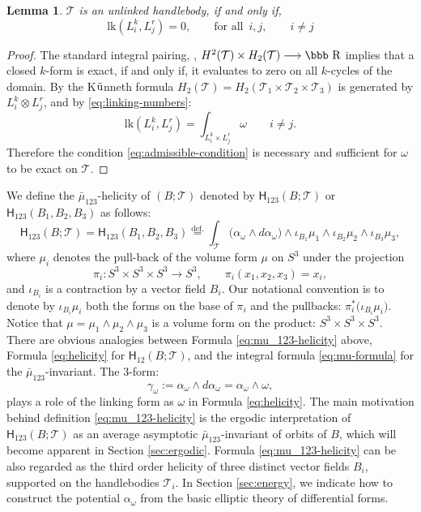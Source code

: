 \documentclass[12pt]{article}
\numberwithin{equation}{section}
\newtheorem{lemma}[theorem]{Lemma}
\newcommand{\R}{\mbox{\bbb R}}       %
\newcommand{\no}{\noindent}
\begin{document}
\begin{lemma}\label{lem:unlinked-handlebody}
  $\mathcal{T}$ is an unlinked handlebody, if and only if, 
  \begin{equation}\label{eq:admissible-condition}
  \text{lk}(L^k_i,L^r_j)  = 0,\qquad \text{for all\ }\, i,j,\qquad i\neq j
 \end{equation}
\end{lemma}
\begin{proof}
The standard integral pairing, \cite{Bott82}, $H^2(\mathcal{T})\times H_2(\mathcal{T})\longrightarrow \R$ implies that a closed $k$-form is exact, if and only if, it evaluates to zero on all $k$-cycles of the domain. By the K$\ddot{\rm u}$nneth formula $H_2(\mathcal{T})=H_2(\mathcal{T}_1\times \mathcal{T}_2\times \mathcal{T}_3)$ is generated by $L^k_i\otimes L^r_j$, and by \eqref{eq:linking-numbers}:
\[
 \text{lk}(L^k_i,L^r_j) = \int_{L^k_i\times L^r_j} \omega\qquad  i\neq j.
\]
Therefore the condition \eqref{eq:admissible-condition} is necessary and sufficient for $\omega$ to be exact on $\mathcal{T}$.
\end{proof}

\no We define the $\bar{\mu}_{123}$-helicity of $(B;\mathcal{T})$  denoted by $\mathsf{H}_{123}(B;\mathcal{T})$ or $\mathsf{H}_{123}(B_1,B_2,B_3)$
as follows:
\begin{equation}\label{eq:mu_123-helicity}
\boxed{\mathsf{H}_{123}(B;\mathcal{T})=\mathsf{H}_{123}(B_1,B_2,B_3)\stackrel{\text{def.}}{=}\int_{\mathcal{T}} \bigl(\alpha_\omega\wedge d\alpha_\omega\bigr)\wedge \iota_{B_1}\mu_1\wedge \iota_{B_2}\mu_2\wedge \iota_{B_3}\mu_3, }
\end{equation}
where $\mu_i$ denotes the pull-back of the volume form $\mu$ on $S^3$ under the projection 
\begin{equation}\label{eq:projection-i}
\pi_i:S^3\times S^3\times S^3\longrightarrow S^3,\qquad \pi_i(x_1,x_2,x_3)=x_i,
\end{equation}
and $\iota_{B_i}$ is a contraction by a vector field $B_i$. Our notational convention is to denote by $\iota_{B_i}\mu_i$ both the forms on the base of $\pi_i$ and the pullbacks: $\pi^\ast_i\bigl(\iota_{B_i}\mu_i\bigr)$. Notice that $\mu=\mu_1\wedge\mu_2\wedge\mu_3$ is a volume form on the product: $S^3\times S^3\times S^3$.   
 There are obvious analogies between Formula \eqref{eq:mu_123-helicity} above, Formula \eqref{eq:helicity} for $\mathsf{H}_{12}(B;\mathcal{T})$, and the integral formula \eqref{eq:mu-formula} for the 
$\bar{\mu}_{123}$-invariant. The $3$-form:
 \[
 \gamma_\omega:=\alpha_\omega\wedge d\alpha_\omega=\alpha_\omega\wedge \omega,
 \]
 plays a role of the linking form as $\omega$ in Formula \eqref{eq:helicity}. 
 The main motivation behind definition \eqref{eq:mu_123-helicity} is the ergodic interpretation  of $\mathsf{H}_{123}(B;\mathcal{T})$ as an average asymptotic $\bar{\mu}_{123}$-invariant of orbits of $B$, which will become apparent in Section \ref{sec:ergodic}. Formula \eqref{eq:mu_123-helicity} can be also 
 regarded as the third order helicity of three distinct vector fields $B_i$, supported on the handlebodies $\mathcal{T}_i$. In Section \ref{sec:energy}, we indicate how to construct the potential $\alpha_\omega$ from the basic elliptic theory of differential forms.
\end{document}
